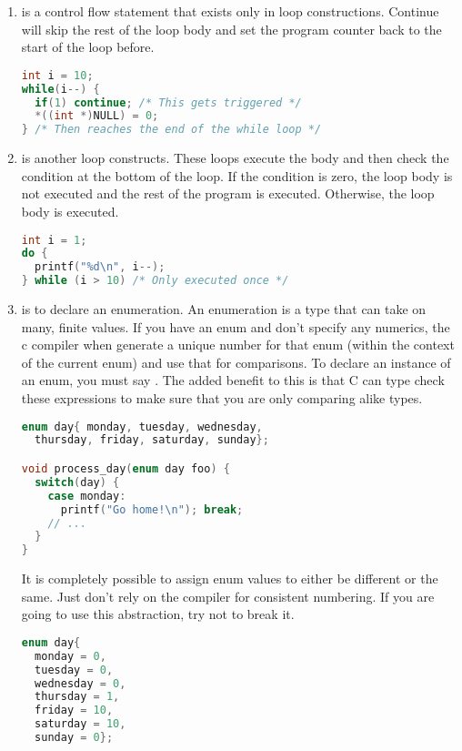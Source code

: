 \begin{enumerate}
\item {} is a control flow statement that exists only in loop constructions. Continue will skip the rest of the loop body and set the program counter back to the start of the loop before.

\begin{lstlisting}[language=C]
int i = 10;
while(i--) {
  if(1) continue; /* This gets triggered */
  *((int *)NULL) = 0;
} /* Then reaches the end of the while loop */
\end{lstlisting}

\item {} is another loop constructs. These loops execute the body and then check the condition at the bottom of the loop. If the condition is zero, the loop body is not executed and the rest of the program is executed. Otherwise, the loop body is executed.

\begin{lstlisting}[language=C]
int i = 1;
do {
  printf("%d\n", i--);
} while (i > 10) /* Only executed once */
\end{lstlisting}

\item {} is to declare an enumeration. An enumeration is a type that can take on many, finite values. If you have an enum and don't specify any numerics, the c compiler when generate a unique number for that enum (within the context of the current enum) and use that for comparisons. To declare an instance of an enum, you must say . The added benefit to this is that C can type check these expressions to make sure that you are only comparing alike types.

\begin{lstlisting}[language=C]
enum day{ monday, tuesday, wednesday,
  thursday, friday, saturday, sunday};

void process_day(enum day foo) {
  switch(day) {
    case monday:
      printf("Go home!\n"); break;
    // ...
  }
}
\end{lstlisting}

It is completely possible to assign enum values to either be different or the same. Just don't rely on the compiler for consistent numbering. If you are going to use this abstraction, try not to break it.

\begin{lstlisting}[language=C]
enum day{ 
  monday = 0, 
  tuesday = 0, 
  wednesday = 0,
  thursday = 1, 
  friday = 10, 
  saturday = 10, 
  sunday = 0};


\end{lstlisting}
\end{enumerate}

